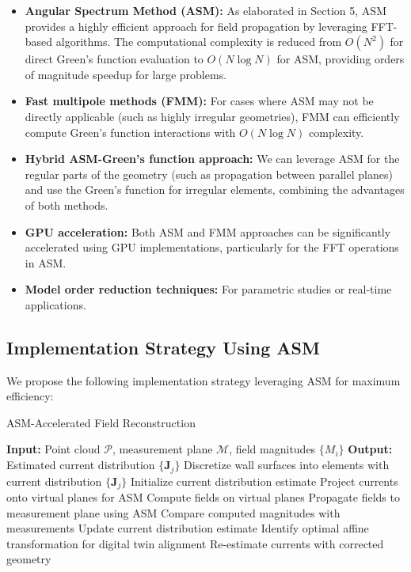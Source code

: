 \documentclass[12pt,a4paper]{article}
\begin{document}
\begin{itemize}
    \item \textbf{Angular Spectrum Method (ASM):} As elaborated in Section 5, ASM provides a highly efficient approach for field propagation by leveraging FFT-based algorithms. The computational complexity is reduced from $O(N^2)$ for direct Green's function evaluation to $O(N \log N)$ for ASM, providing orders of magnitude speedup for large problems.
    
    \item \textbf{Fast multipole methods (FMM):} For cases where ASM may not be directly applicable (such as highly irregular geometries), FMM can efficiently compute Green's function interactions with $O(N \log N)$ complexity.
    
    \item \textbf{Hybrid ASM-Green's function approach:} We can leverage ASM for the regular parts of the geometry (such as propagation between parallel planes) and use the Green's function for irregular elements, combining the advantages of both methods.
    
    \item \textbf{GPU acceleration:} Both ASM and FMM approaches can be significantly accelerated using GPU implementations, particularly for the FFT operations in ASM.
    
    \item \textbf{Model order reduction techniques:} For parametric studies or real-time applications.
\end{itemize}

\subsection{Implementation Strategy Using ASM}

We propose the following implementation strategy leveraging ASM for maximum efficiency:

\begin{algorithm}
\caption{ASM-Accelerated Field Reconstruction}
\begin{algorithmic}[1]
\State \textbf{Input:} Point cloud $\mathcal{P}$, measurement plane $\mathcal{M}$, field magnitudes $\{M_i\}$
\State \textbf{Output:} Estimated current distribution $\{\mathbf{J}_j\}$
\State Discretize wall surfaces into elements with current distribution $\{\mathbf{J}_j\}$
\State Initialize current distribution estimate
    \State Project currents onto virtual planes for ASM
    \State Compute fields on virtual planes
    \State Propagate fields to measurement plane using ASM
    \State Compare computed magnitudes with measurements
    \State Update current distribution estimate
\EndWhile
\State Identify optimal affine transformation for digital twin alignment
\State Re-estimate currents with corrected geometry
\end{algorithmic}
\end{algorithm}
\end{document}
